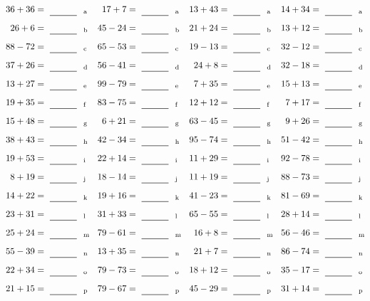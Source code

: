 \documentclass
[
  draft    = true,
  fontsize = 11pt,
  parskip  = half-
]
{scrartcl}
\begin{document}
\clearpage
\begin{align*}
    \pline{36+36}&=\rline{a}
  & \pline{17+7}&=\rline{a}
  & \pline{13+43}&=\rline{a}
  & \pline{14+34}&=\rline{a} \\[1ex]
    \pline{26+6}&=\rline{b}
  & \pline{45-24}&=\rline{b}
  & \pline{21+24}&=\rline{b}
  & \pline{13+12}&=\rline{b} \\[1ex]
    \pline{88-72}&=\rline{c}
  & \pline{65-53}&=\rline{c}
  & \pline{19-13}&=\rline{c}
  & \pline{32-12}&=\rline{c} \\[1ex]
    \pline{37+26}&=\rline{d}
  & \pline{56-41}&=\rline{d}
  & \pline{24+8}&=\rline{d}
  & \pline{32-18}&=\rline{d} \\[1ex]
    \pline{13+27}&=\rline{e}
  & \pline{99-79}&=\rline{e}
  & \pline{7+35}&=\rline{e}
  & \pline{15+13}&=\rline{e} \\[1ex]
    \pline{19+35}&=\rline{f}
  & \pline{83-75}&=\rline{f}
  & \pline{12+12}&=\rline{f}
  & \pline{7+17}&=\rline{f} \\[1ex]
    \pline{15+48}&=\rline{g}
  & \pline{6+21}&=\rline{g}
  & \pline{63-45}&=\rline{g}
  & \pline{9+26}&=\rline{g} \\[1ex]
    \pline{38+43}&=\rline{h}
  & \pline{42-34}&=\rline{h}
  & \pline{95-74}&=\rline{h}
  & \pline{51-42}&=\rline{h} \\[1ex]
    \pline{19+53}&=\rline{i}
  & \pline{22+14}&=\rline{i}
  & \pline{11+29}&=\rline{i}
  & \pline{92-78}&=\rline{i} \\[1ex]
    \pline{8+19}&=\rline{j}
  & \pline{18-14}&=\rline{j}
  & \pline{11+19}&=\rline{j}
  & \pline{88-73}&=\rline{j} \\[1ex]
    \pline{14+22}&=\rline{k}
  & \pline{19+16}&=\rline{k}
  & \pline{41-23}&=\rline{k}
  & \pline{81-69}&=\rline{k} \\[1ex]
    \pline{23+31}&=\rline{l}
  & \pline{31+33}&=\rline{l}
  & \pline{65-55}&=\rline{l}
  & \pline{28+14}&=\rline{l} \\[1ex]
    \pline{25+24}&=\rline{m}
  & \pline{79-61}&=\rline{m}
  & \pline{16+8}&=\rline{m}
  & \pline{56-46}&=\rline{m} \\[1ex]
    \pline{55-39}&=\rline{n}
  & \pline{13+35}&=\rline{n}
  & \pline{21+7}&=\rline{n}
  & \pline{86-74}&=\rline{n} \\[1ex]
    \pline{22+34}&=\rline{o}
  & \pline{79-73}&=\rline{o}
  & \pline{18+12}&=\rline{o}
  & \pline{35-17}&=\rline{o} \\[1ex]
    \pline{21+15}&=\rline{p}
  & \pline{79-67}&=\rline{p}
  & \pline{45-29}&=\rline{p}
  & \pline{31+14}&=\rline{p}
\end{align*}
\end{document}

